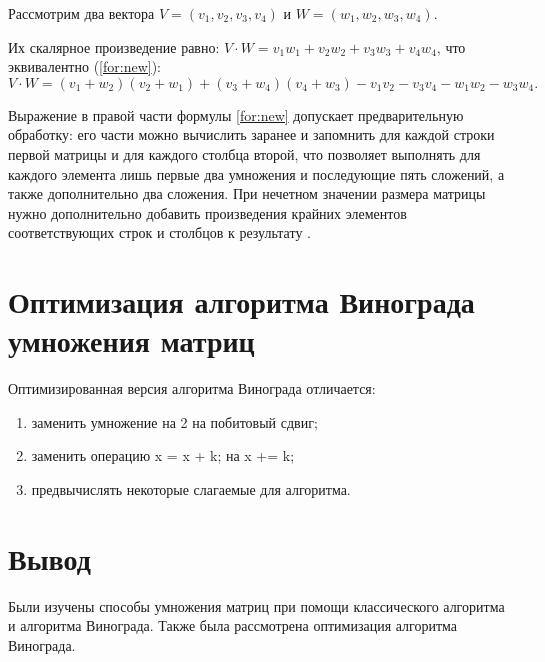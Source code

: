 Рассмотрим два вектора $V = (v_1, v_2, v_3, v_4)$ и $W = (w_1, w_2, w_3, w_4)$.

Их скалярное произведение равно: $V \cdot W = v_1w_1 + v_2w_2 + v_3w_3 + v_4w_4$, что эквивалентно (\ref{for:new}):
\begin{equation}
	\label{for:new}
	V \cdot W = (v_1 + w_2)(v_2 + w_1) + (v_3 + w_4)(v_4 + w_3) - v_1v_2 - v_3v_4 - w_1w_2 - w_3w_4.
\end{equation}

Выражение в правой части формулы \ref{for:new} допускает предварительную обработку: его части можно вычислить заранее и запомнить для каждой строки первой матрицы и для каждого
столбца второй, что позволяет выполнять для каждого элемента лишь первые два умножения и последующие пять сложений, а также дополнительно два сложения. При нечетном значении размера матрицы нужно дополнительно добавить произведения крайних элементов соответствующих строк и столбцов к результату \cite{alg}.

\section{Оптимизация алгоритма Винограда умножения матриц}

Оптимизированная версия алгоритма Винограда \cite{alg} отличается:

\begin{enumerate}
	\item заменить умножение на 2 на побитовый сдвиг;
	\item заменить операцию x = x + k; на x += k;
	\item предвычислять некоторые слагаемые для алгоритма.
\end{enumerate}

\section{Вывод}

Были изучены способы умножения матриц при помощи классического алгоритма и алгоритма Винограда. Также была рассмотрена оптимизация алгоритма Винограда.
